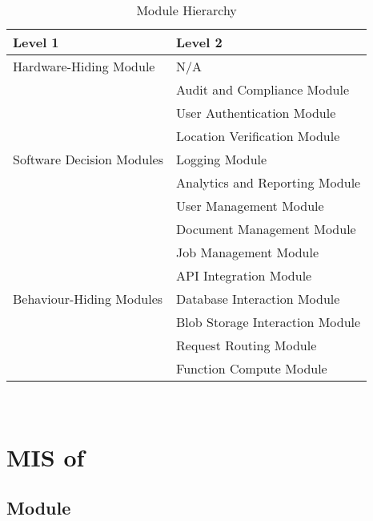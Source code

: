 \documentclass[12pt, titlepage]{article}
\begin{document}
\begin{table}[h!]
  \centering
  \begin{tabular}{p{} p{}}
    \toprule
    \textbf{Level 1}                                       &
    \textbf{Level 2}
    \\
    \midrule

    {Hardware-Hiding Module}                               & N/A
    \\
    \midrule

    \multirow{7}{0.3\textwidth}{Software Decision Modules} & Audit
    and Compliance Module
    \\
    & User Authentication Module      \\
    & Location Verification Module    \\
    & Logging Module                  \\
    & Analytics and Reporting Module  \\
    & User Management Module          \\
    & Document Management Module      \\
    & Job Management Module           \\
    \midrule

    \multirow{3}{0.3\textwidth}{Behaviour-Hiding Modules}  & {API
    Integration Module}
    \\
    & Database Interaction Module     \\
    & Blob Storage Interaction Module \\
    & Request Routing Module          \\
    & Function Compute Module         \\
    \bottomrule
  \end{tabular}
  \caption{Module Hierarchy}
  \label{TblMH}
\end{table}

\newpage
~\newpage

\section{MIS of } \label{Module} 



\subsection{Module}
\end{document}
